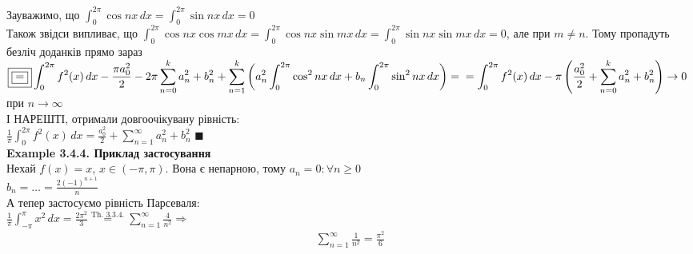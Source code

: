 \documentclass{math_library}
\begin{document}
Зауважимо, що $\displaystyle \int_0^{2\pi} \cos nx \,dx = \int_0^{2\pi} \sin nx \,dx = 0$\\
Також звідси випливає, що $\displaystyle \int_0^{2\pi} \cos nx \cos mx \,dx = \int_0^{2\pi} \cos nx \sin mx \,dx = \int_0^{2\pi} \sin nx \sin mx \,dx = 0$, але при $m \neq n$. Тому пропадуть безліч доданків прямо зараз\\
$\displaystyle \boxed{\boxed{=}} \int_0^{2\pi} f^2(x)\,dx -\frac{\pi a_0^2}{2} - 2\pi \sum_{n=0}^k a_n^2 + b_n^2 + \sum_{n=1}^k \left(a_n^2 \int_0^{2\pi} \cos^2 nx \,dx + b_n \int_0^{2\pi} \sin^2 nx \,dx  \right) = \\
= \int_0^{2\pi} f^2(x)\,dx - \pi \left(\frac{a^2_0}{2} + \sum_{n=0}^k a_n^2 + b_n^2 \right) \to 0$ при $n \to \infty$\\
І НАРЕШТІ, отримали довгоочікувану рівність:\\
$\displaystyle \frac{1}{\pi} \int_{0}^{2\pi} f^2(x)\,dx = \frac{a_0^2}{2} + \sum_{n=1}^{\infty} a_n^2 + b_n^2$ $\blacksquare$
\bigskip \\
\textbf{Example 3.4.4. Приклад застосування}\\
Нехай $f(x) = x$, $x \in (-\pi, \pi)$. Вона є непарною, тому $a_n = 0: \forall n \geq 0$\\
$\displaystyle b_n = \dots = \frac{2(-1)^{n+1}}{n}$\\
А тепер застосуємо рівність Парсеваля:\\
$\displaystyle \frac{1}{\pi} \int_{-\pi}^{\pi} x^2\,dx = \frac{2\pi^2}{3} \overset{\textrm{Th. 3.3.4.}}{=} \sum_{n=1}^{\infty} \frac{4}{n^2} \Rightarrow$
\begin{align*}
\sum_{n=1}^{\infty} \frac{1}{n^2} = \frac{\pi^2}{6}
\end{align*}
\bigskip \\

\iffalse
\end{document}
